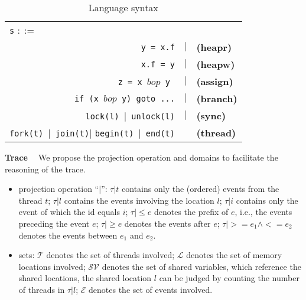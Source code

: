 
\begin{table}
	\begin{center}
		\begin{tabular}{rcl}
			\multicolumn{1}{l}{{\tt s} $::=$} & & \\
			{\tt y = x.f} & $|$ & {\bf (heapr)} \\ 
			{\tt x.f = y}  & $|$ & {\bf (heapw)} \\ %
			{\tt z = x $bop$ y}\  & $|$ & {\bf (assign)} \\ %
			{\tt if (x $bop$  y) goto ...} & $|$ &  {\bf (branch)} \\
			{\tt lock(l)}\ $|$\ {\tt unlock(l)}  & $|$& {\bf (sync)} \\
			{\tt fork(t)}\ $|$\ {\tt join(t)}$|$ {\tt begin(t)}\ $|$\ {\tt end(t)} &  & {\bf (thread)}
		\end{tabular}
	\end{center}
	\caption{\label{Ta:syntax}Language syntax}
\end{table}


{\bf Trace \ } 
We propose the projection operation and domains to facilitate the reasoning of the trace.
\begin{itemize}
\item projection operation  ``$|$'': $\tau|t$ contains only the (ordered) events from the thread $t$; $\tau|l$ contains the events involving the location $l$; $\tau|i$ contains only the event of which the id equals $i$; $\tau|\leq e$ denotes the prefix of $e$, i.e., the events preceding the event $e$; $\tau|\geq e$ denotes the events after $e$; $\tau|>=e_1\wedge <=e_2$ denotes the events between $e_1$ and $e_2$.
\item sets: $\mathcal{T}$ denotes the set of threads involved;  $\mathcal{L}$ denotes the set of memory locations involved; 
$\mathcal{SV}$ denotes the set of shared variables, which reference the shared locations, the shared location $l$ can be judged by counting the number of threads in $\tau|l$;  $\mathcal{E}$ denotes the set of events involved.
\end{itemize}






